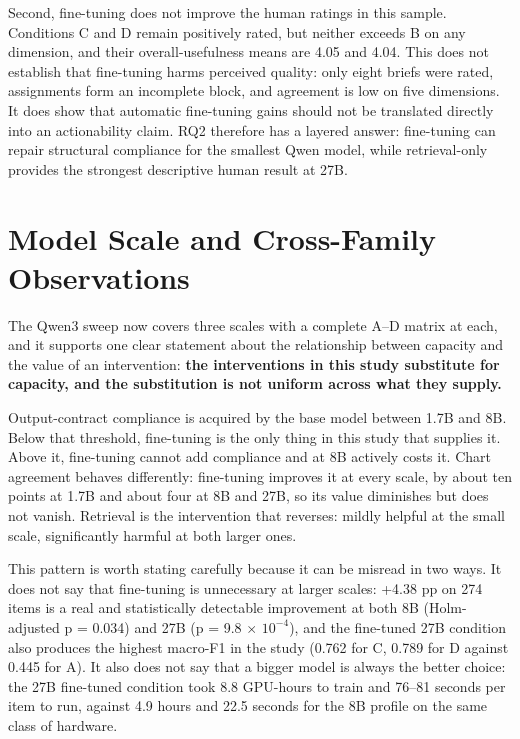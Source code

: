 Second, fine-tuning does not improve the human ratings in this sample. Conditions C and D remain positively rated, but neither exceeds B on any dimension, and their overall-usefulness means are 4.05 and 4.04. This does not establish that fine-tuning harms perceived quality: only eight briefs were rated, assignments form an incomplete block, and agreement is low on five dimensions. It does show that automatic fine-tuning gains should not be translated directly into an actionability claim. RQ2 therefore has a layered answer: fine-tuning can repair structural compliance for the smallest Qwen model, while retrieval-only provides the strongest descriptive human result at 27B.

\section{Model Scale and Cross-Family Observations}

The Qwen3 sweep now covers three scales with a complete A--D matrix at each, and it supports one clear statement about the relationship between capacity and the value of an intervention: \textbf{the interventions in this study substitute for capacity, and the substitution is not uniform across what they supply.}

Output-contract compliance is acquired by the base model between 1.7B and 8B. Below that threshold, fine-tuning is the only thing in this study that supplies it. Above it, fine-tuning cannot add compliance and at 8B actively costs it. Chart agreement behaves differently: fine-tuning improves it at every scale, by about ten points at 1.7B and about four at 8B and 27B, so its value diminishes but does not vanish. Retrieval is the intervention that reverses: mildly helpful at the small scale, significantly harmful at both larger ones.

This pattern is worth stating carefully because it can be misread in two ways. It does not say that fine-tuning is unnecessary at larger scales: +4.38 pp on 274 items is a real and statistically detectable improvement at both 8B (Holm-adjusted p = 0.034) and 27B (p = 9.8 \(\times\) \(10^{-4}\)), and the fine-tuned 27B condition also produces the highest macro-F1 in the study (0.762 for C, 0.789 for D against 0.445 for A). It also does not say that a bigger model is always the better choice: the 27B fine-tuned condition took 8.8 GPU-hours to train and 76--81 seconds per item to run, against 4.9 hours and 22.5 seconds for the 8B profile on the same class of hardware.

